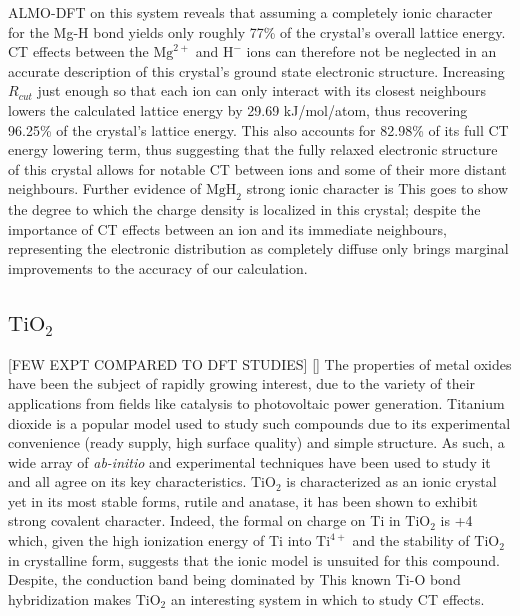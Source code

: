 \documentclass[aps,prb,twocolumn,amsmath,amssymb,superscriptaddress,longbibliography]{revtex4-1}
\begin{document}
ALMO-DFT on this system reveals that assuming a completely ionic character for the Mg-H bond yields only roughly 77\% of the crystal's overall lattice energy. 
CT effects between the $\text{Mg}^{2+}$ and $\text{H}^-$ ions can therefore not be neglected in an accurate description of this crystal's ground state electronic structure. 
Increasing $R_{cut}$ just enough so that each ion can only interact with its closest neighbours lowers the calculated lattice energy by 29.69 kJ/mol/atom, thus recovering 96.25\% of the crystal's lattice energy. 
This also accounts for 82.98\% of its full CT energy lowering term, thus suggesting that the fully relaxed electronic structure of this crystal allows for notable CT between ions and some of their more distant neighbours.
Further evidence of $\text{MgH}_{2}$ strong ionic character is  
This goes to show the degree to which the charge density is localized in this crystal; despite the importance of CT effects between an ion and its immediate neighbours, representing the electronic distribution as completely diffuse only brings marginal improvements to the accuracy of our calculation. 


\subsection*{$\text{TiO}_{2}$}

[FEW EXPT COMPARED TO DFT STUDIES]
[]
The properties of metal oxides have been the subject of rapidly growing interest, due to the variety of their applications from fields like catalysis to photovoltaic power generation. 
Titanium dioxide is a popular model used to study such compounds due to its experimental convenience (ready supply, high surface quality) and simple structure.
As such, a wide array of \emph{ab-initio} and experimental techniques have been used to study it and all agree on its key characteristics.
$\text{TiO}_{2}$ is characterized as an ionic crystal yet in its most stable forms, rutile and anatase, it has been shown to exhibit strong covalent character\cite{}.
Indeed, the formal on charge on Ti in $\text{TiO}_{2}$ is +4 which, given the high ionization energy of Ti into $\text{Ti}^{4+}$ and the stability of $\text{TiO}_{2}$ in crystalline form, suggests that the ionic model is unsuited for this compound.
Despite, the conduction band being dominated by 
This known Ti-O bond hybridization makes $\text{TiO}_{2}$ an interesting system in which to study CT effects. \\
\end{document}
